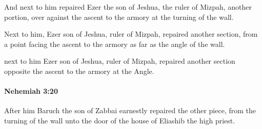 			\begin{versebox}
					\item[BHS] 
					\item[LXX] 
					\item[ASV] And next to him repaired Ezer the son of Jeshua, the ruler of Mizpah, another portion, over against the ascent to the armory at the turning of the wall.
					\item[NIV] Next to him, Ezer son of Jeshua, ruler of Mizpah, repaired another section, from a point facing the ascent to the armory as far as the angle of the wall.
					\item[NRSV] next to him Ezer son of Jeshua, ruler of Mizpah, repaired another section opposite the ascent to the armory at the Angle.
			\end{versebox}

		\paragraph{Nehemiah 3:20} %
			\label{NEHEMIAH-3-20}

			After him Baruch the son of Zabbai earnestly repaired the other piece, from the turning of the wall unto the door of the house of Eliashib the high priest.

